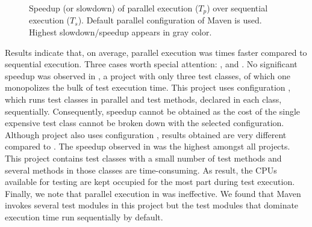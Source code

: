 \begin{figure}[h!]
\centering
{}
\caption{\label{tab:speedup}Speedup (or slowdown) of parallel
  execution ($T_p$) over sequential execution ($T_s$).  Default
  parallel configuration of Maven is used.  Highest slowdown/speedup
  appears in gray color.}
\end{figure}

Results indicate that, on average, parallel execution was
\avgSpeedup{} times faster compared to sequential execution.  Three
cases worth special attention: ,  and
.  No significant speedup was observed in
, a project with only three test classes, of which one
monopolizes the bulk of test execution time.  This project uses
configuration \ParClassSeqMeth{}, which runs test classes in parallel
and test methods, declared in each class, sequentially.  Consequently,
speedup cannot be obtained as the cost of the single expensive test
class cannot be broken down with the selected configuration.  Although
project  also uses configuration \ParClassSeqMeth{},
results obtained are very different compared to .  The
speedup observed in  was the highest amongst all
projects.  This project contains test classes with a small number of
test methods and several methods in those classes are time-consuming.
As result, the CPUs available for testing are kept occupied for the
most part during test execution.  Finally, we note that parallel
execution in  was ineffective.  We found that Maven
invokes several test modules in this project but the test modules that
dominate execution time run sequentially by default.

